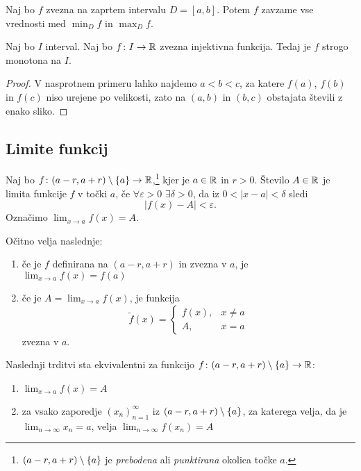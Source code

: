 \documentclass[12pt, a4paper]{article}
\begin{document}
\begin{posledica}
Naj bo $f$ zvezna na zaprtem intervalu $D=[a,b]$. Potem $f$ zavzame vse vrednosti med $\displaystyle\min_D f$ in $\displaystyle\max_D f$.
\end{posledica}

\begin{posledica}
Naj bo $I$ interval. Naj bo $f\colon I\to\mathbb{R}$ zvezna injektivna funkcija. Tedaj je $f$ strogo monotona na $I$.
\end{posledica}

\begin{proof}
V nasprotnem primeru lahko najdemo $a<b<c$, za katere $f(a)$, $f(b)$ in $f(c)$ niso urejene po velikosti, zato na $(a,b)$ in $(b,c)$ obstajata števili z enako sliko.
\end{proof}

\newpage

\subsection{Limite funkcij}

\begin{okvir}
\begin{definicija}
Naj bo $f\colon(a-r,a+r)\setminus\left\{a\right\}\to\mathbb{R}$,\footnote{$(a-r,a+r)\setminus\left\{a\right\}$ je \emph{prebodena} ali \emph{punktirana} okolica točke $a$.} kjer je $a\in\mathbb{R}$ in $r>0$. Število $A\in\mathbb{R}$ je limita funkcije $f$ v točki $a$, če $\forall\varepsilon>0$ $\exists\delta>0$, da iz $0<|x-a|<\delta$ sledi
\[
\left|f(x)-A\right|<\varepsilon.
\]
Označimo $\displaystyle\lim_{x\to a}f(x)=A$.
\end{definicija}
\end{okvir}

\begin{posledica}
Očitno velja naslednje:

\begin{enumerate}[label=\arabic*)]
\item če je $f$ definirana na $(a-r,a+r)$ in zvezna v $a$, je $\displaystyle\lim_{x\to a}f(x)=f(a)$
\item če je $A=\displaystyle\lim_{x\to a}f(x)$, je funkcija
\[
\tilde{f}(x)=\begin{cases}
f(x), &x\ne a
\\
A, &x=a
\end{cases}
\]
zvezna v $a$.
\end{enumerate}
\end{posledica}

\begin{izrek}
Naslednji trditvi sta ekvivalentni za funkcijo $f\colon(a-r,a+r)\setminus\left\{a\right\}\to\mathbb{R}$:

\begin{enumerate}[label=\arabic*)]
\item $\displaystyle\lim_{x\to a}f(x)=A$
\item za vsako zaporedje $(x_n)_{n=1}^\infty$ iz $(a-r,a+r)\setminus\left\{a\right\}$, za katerega velja, da je $\displaystyle\lim_{n\to\infty}x_n=a$, velja $\displaystyle\lim_{n\to\infty}f\left(x_n\right)=A$
\end{enumerate}
\end{izrek}
\end{document}
